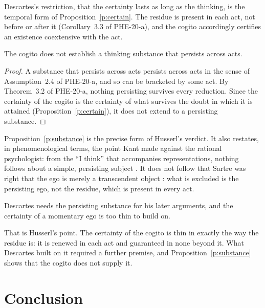 \documentclass{situationist-preprint}
\begin{document}
Descartes's restriction, that the certainty lasts as long as the thinking, is the temporal form of Proposition~\ref{p:certain}. The residue is present in each act, not before or after it (Corollary~3.3 of PHE-20-a), and the cogito accordingly certifies an existence coextensive with the act.

\begin{proposition}\label{p:substance}
The cogito does not establish a thinking substance that persists across acts.
\end{proposition}

\begin{proof}
A substance that persists across acts persists across acts in the sense of Assumption~2.4 of PHE-20-a, and so can be bracketed by some act. By Theorem~3.2 of PHE-20-a, nothing persisting survives every reduction. Since the certainty of the cogito is the certainty of what survives the doubt in which it is attained (Proposition~\ref{p:certain}), it does not extend to a persisting substance.
\end{proof}

Proposition~\ref{p:substance} is the precise form of Husserl's verdict. It also restates, in phenomenological terms, the point Kant made against the rational psychologist: from the \enquote{I think} that accompanies representations, nothing follows about a simple, persisting subject \citep[A341--405/B399--432]{Kant1781}. It does not follow that Sartre was right that the ego is merely a transcendent object \citep{Sartre1937}: what is excluded is the persisting ego, not the residue, which is present in every act.

\begin{objection}
Descartes needs the persisting substance for his later arguments, and the certainty of a momentary ego is too thin to build on.
\end{objection}

\begin{reply}
That is Husserl's point. The certainty of the cogito is thin in exactly the way the residue is: it is renewed in each act and guaranteed in none beyond it. What Descartes built on it required a further premise, and Proposition~\ref{p:substance} shows that the cogito does not supply it.
\end{reply}

\section{Conclusion}
\end{document}
